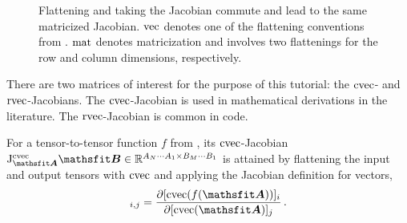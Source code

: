 \begin{figure}[!h]
  \centering
  \caption{Flattening and taking the Jacobian commute and lead to the same matricized Jacobian.
    $\vec$ denotes one of the flattening conventions from .
    $\mat$ denotes matricization and involves two flattenings for the row and column dimensions, respectively.}
\end{figure}

There are two matrices of interest for the purpose of this tutorial: the $\cvec$- and $\rvec$-Jacobians.
The $\cvec$-Jacobian is used in mathematical derivations in the literature.
The $\rvec$-Jacobian is common in code.

\begin{definition}\label{def:cvec_jacobian}
  For a tensor-to-tensor function $f$ from , its $\cvec$-Jacobian $\jac^{\cvec}_{\tA}\tB \in \sR^{A_N \cdots A_1 \times B_M \cdots B_1}$ is attained by flattening the input and output tensors with $\cvec$ and applying the Jacobian definition for vectors,
  \begin{align*}
    [\jac^{\cvec}_{\tA}\tB]_{i,j}
    =
    \frac{\partial [\cvec(f(\tA))]_i}{\partial [\cvec(\tA)]_j}\,.
  \end{align*}
\end{definition}

